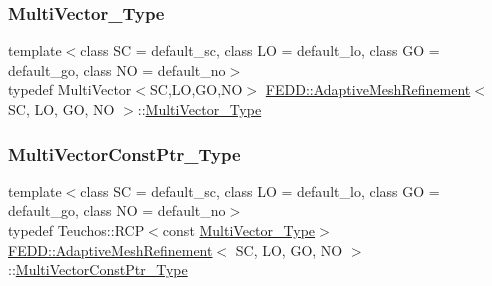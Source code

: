 \subsubsection{\texorpdfstring{Multi\+Vector\+\_\+\+Type}{MultiVector\_Type}}
{\footnotesize\ttfamily template$<$class SC = default\+\_\+sc, class LO = default\+\_\+lo, class GO = default\+\_\+go, class NO = default\+\_\+no$>$ \\
typedef Multi\+Vector$<$SC,LO,GO,NO$>$ \hyperlink{classFEDD_1_1AdaptiveMeshRefinement}{F\+E\+D\+D\+::\+Adaptive\+Mesh\+Refinement}$<$ SC, LO, GO, NO $>$\+::\hyperlink{classFEDD_1_1AdaptiveMeshRefinement_afba165f2caa97c6de40654b1ee51e38d}{Multi\+Vector\+\_\+\+Type}}

\mbox{\label{classFEDD_1_1AdaptiveMeshRefinement_ad8871639b0a35039184611ce286a446c}} 
\subsubsection{\texorpdfstring{Multi\+Vector\+Const\+Ptr\+\_\+\+Type}{MultiVectorConstPtr\_Type}}
{\footnotesize\ttfamily template$<$class SC = default\+\_\+sc, class LO = default\+\_\+lo, class GO = default\+\_\+go, class NO = default\+\_\+no$>$ \\
typedef Teuchos\+::\+R\+CP$<$const \hyperlink{classFEDD_1_1AdaptiveMeshRefinement_afba165f2caa97c6de40654b1ee51e38d}{Multi\+Vector\+\_\+\+Type}$>$ \hyperlink{classFEDD_1_1AdaptiveMeshRefinement}{F\+E\+D\+D\+::\+Adaptive\+Mesh\+Refinement}$<$ SC, LO, GO, NO $>$\+::\hyperlink{classFEDD_1_1AdaptiveMeshRefinement_ad8871639b0a35039184611ce286a446c}{Multi\+Vector\+Const\+Ptr\+\_\+\+Type}}

\mbox{\label{classFEDD_1_1AdaptiveMeshRefinement_a582403f1b9f5ba542a6269e1b00a9031}} 
